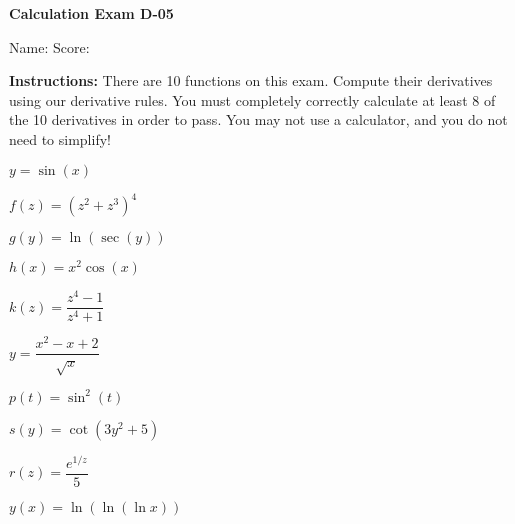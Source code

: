 \documentclass[10pt,answers,addpoints]{exam}
\begin{document}



{\bfseries\large Calculation Exam D-05}
{}%

Name: \makebox[4.18in]{\hrulefill} \quad Score: \makebox[0.75in]{\hrulefill} %


\vspace{0.2in}

\textbf{Instructions: } There are 10 functions on this exam. Compute their derivatives using our derivative rules. You must completely correctly calculate at least 8 of the 10 derivatives in order to pass. You may not use a calculator, and you do not need to simplify! 




\begin{questions}

\question $y = \sin(x)$

\vfill

\question $f(z) = (z^2+z^3)^4$

\vfill

\question $g(y)= \ln(\sec(y))$

\vfill


\question $h(x) = x^2\cos(x)$

\vfill

\question $k(z) = \dfrac{z^4 -1}{z^4+1}$

\vfill

\newpage


\question $y = \dfrac{x^2 - x + 2}{\sqrt{x}}$

\vfill


\question $p(t) = \sin^2(t)$

\vfill

\question $s(y) = \cot(3y^2+5)$

\vfill

\question $r(z) = \dfrac{e^{1/z}}{5}$

\vfill

\question $y(x) = \ln(\ln(\ln x))$

\vfill

\thispagestyle{empty}

\end{questions}
\end{document}
